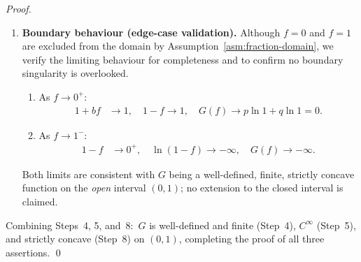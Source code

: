 \documentclass[12pt,openany]{book}
\numberwithin{equation}{chapter}
\theoremstyle{plain}
\theoremstyle{definition}
\theoremstyle{remark}
\numberwithin{equation}{chapter}
\theoremstyle{plain}
\begin{document}
\begin{proof}
\begin{enumerate}[label=\textbf{Step \arabic*.}, leftmargin=*, widest=Step 9]
        Since both terms are strictly negative, their sum
        satisfies:
        \begin{align}
          G''(f)
            &= \underbrace{-\frac{pb^{2}}{(1+bf)^{2}}}_{<\,0}
             + \underbrace{\left(-\frac{q}{(1-f)^{2}}\right)}_{<\,0}
             < 0
             \qquad \forall\, f \in (0,1).
               \label{eq:G-pp-neg}
        \end{align}
        A function that is twice differentiable on an open
        interval with strictly negative second derivative
        throughout that interval is \emph{strictly concave}
        on that interval (see, e.g., Rockafellar
        \cite{rockafellar1970}).  Hence $G$ is strictly concave
        on $(0,1)$. \hfill$\checkmark$

  \item \textbf{Boundary behaviour (edge-case validation).}
        Although $f = 0$ and $f = 1$ are excluded from the
        domain by Assumption~\ref{asm:fraction-domain}, we
        verify the limiting behaviour for completeness and
        to confirm no boundary singularity is overlooked.

        \begin{enumerate}[label=(\alph*)]
          \item As $f \to 0^{+}$:
                \begin{align}
                  1 + bf &\to 1, \quad
                  1 - f  \to 1, \quad
                  G(f)   \to p\ln 1 + q\ln 1 = 0.
                  \label{eq:G-lim-0}
                \end{align}
          \item As $f \to 1^{-}$:
                \begin{align}
                  1 - f  &\to 0^{+},\quad
                  \ln(1-f) \to -\infty,\quad
                  G(f) \to -\infty.
                  \label{eq:G-lim-1}
                \end{align}
        \end{enumerate}
        Both limits are consistent with $G$ being a
        well-defined, finite, strictly concave function on the
        \emph{open} interval $(0,1)$; no extension to the
        closed interval is claimed.

\end{enumerate}

\noindent
Combining Steps~4, 5, and~8:\ $G$ is well-defined and finite
(Step~4), $C^{\infty}$ (Step~5), and strictly concave (Step~8)
on $(0,1)$, completing the proof of all three assertions.
\qed
\end{proof}
\end{document}
